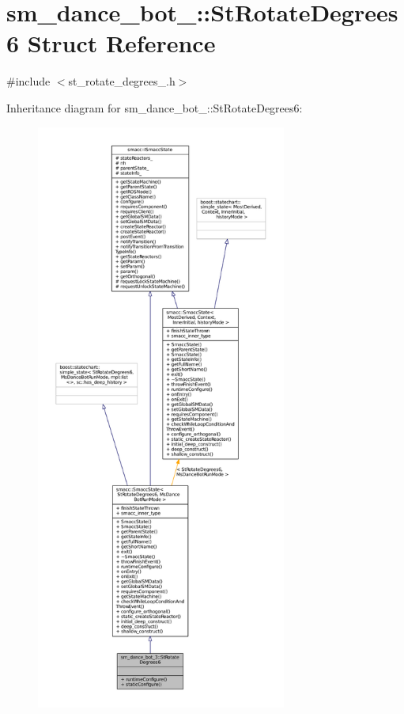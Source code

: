 \hypertarget{structsm__dance__bot__3_1_1StRotateDegrees6}{}\section{sm\+\_\+dance\+\_\+bot\+\_\+:\+:St\+Rotate\+Degrees6 Struct Reference}
\label{structsm__dance__bot__3_1_1StRotateDegrees6}


{\ttfamily \#include $<$st\+\_\+rotate\+\_\+degrees\+\_.\+h$>$}



Inheritance diagram for sm\+\_\+dance\+\_\+bot\+\_\+:\+:St\+Rotate\+Degrees6\+:
\nopagebreak
\begin{figure}[H]
\begin{center}
\leavevmode
\includegraphics[height=550pt]{structsm__dance__bot__3_1_1StRotateDegrees6__inherit__graph}
\end{center}
\end{figure}


